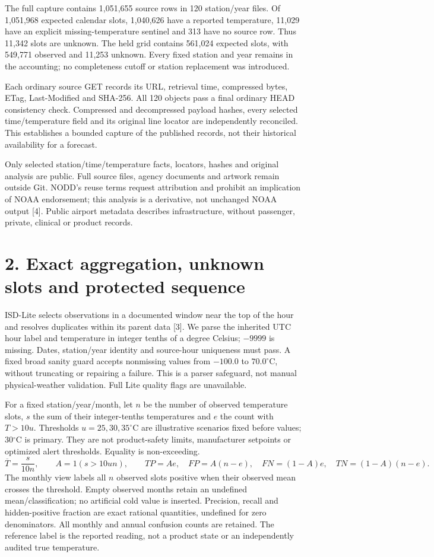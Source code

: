 \documentclass[10pt,letterpaper]{article}
\begin{document}
The full capture contains 1,051,655 source rows in 120 station/year files. Of 1,051,968 expected calendar slots, 1,040,626 have a reported temperature, 11,029 have an explicit missing-temperature sentinel and 313 have no source row. Thus 11,342 slots are unknown. The held grid contains 561,024 expected slots, with 549,771 observed and 11,253 unknown. Every fixed station and year remains in the accounting; no completeness cutoff or station replacement was introduced.

Each ordinary source GET records its URL, retrieval time, compressed bytes, ETag, Last-Modified and SHA-256. All 120 objects pass a final ordinary HEAD consistency check. Compressed and decompressed payload hashes, every selected time/temperature field and its original line locator are independently reconciled. This establishes a bounded capture of the published records, not their historical availability for a forecast.

Only selected station/time/temperature facts, locators, hashes and original analysis are public. Full source files, agency documents and artwork remain outside Git. NODD's reuse terms request attribution and prohibit an implication of NOAA endorsement; this analysis is a derivative, not unchanged NOAA output [4]. Public airport metadata describes infrastructure, without passenger, private, clinical or product records.

\clearpage
\section*{2. Exact aggregation, unknown slots and protected sequence}
ISD-Lite selects observations in a documented window near the top of the hour and resolves duplicates within its parent data [3]. We parse the inherited UTC hour label and temperature in integer tenths of a degree Celsius; $-9999$ is missing. Dates, station/year identity and source-hour uniqueness must pass. A fixed broad sanity guard accepts nonmissing values from $-100.0$ to $70.0^{\circ}$C, without truncating or repairing a failure. This is a parser safeguard, not manual physical-weather validation. Full Lite quality flags are unavailable.

For a fixed station/year/month, let $n$ be the number of observed temperature slots, $s$ the sum of their integer-tenths temperatures and $e$ the count with $T>10u$. Thresholds $u=25,30,35^{\circ}$C are illustrative scenarios fixed before values; 30$^{\circ}$C is primary. They are not product-safety limits, manufacturer setpoints or optimized alert thresholds. Equality is non-exceeding.
\[
\overline T=\frac{s}{10n},\qquad
A=1(s>10un),\qquad
TP=Ae,\quad FP=A(n-e),\quad FN=(1-A)e,\quad TN=(1-A)(n-e).
\]
The monthly view labels all $n$ observed slots positive when their observed mean crosses the threshold. Empty observed months retain an undefined mean/classification; no artificial cold value is inserted. Precision, recall and hidden-positive fraction are exact rational quantities, undefined for zero denominators. All monthly and annual confusion counts are retained. The reference label is the reported reading, not a product state or an independently audited true temperature.
\end{document}
